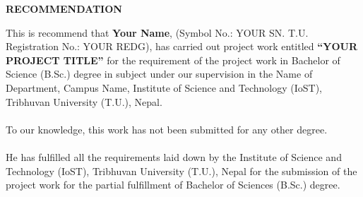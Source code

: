 \newpage
{}
{}
\begin{center}
\Large\bf {RECOMMENDATION}
\end{center}
\vspace{0.9cm} 
This is recommend that \textbf{Your Name}, (Symbol No.: YOUR SN. T.U. Registration No.: YOUR REDG), has carried out project work entitled {\bf ``YOUR PROJECT TITLE''} for the requirement of the project work in Bachelor of Science (B.Sc.) degree in subject under our supervision in the Name of Department, Campus Name, Institute of Science and Technology (IoST), Tribhuvan University (T.U.), Nepal.\\
\\
To our knowledge, this work has not been submitted for any other degree.\\
\\
He has fulfilled all the requirements laid down by the Institute of Science and Technology (IoST), Tribhuvan University (T.U.), Nepal for the submission of the project work for the partial fulfillment of Bachelor of Sciences (B.Sc.) degree.

